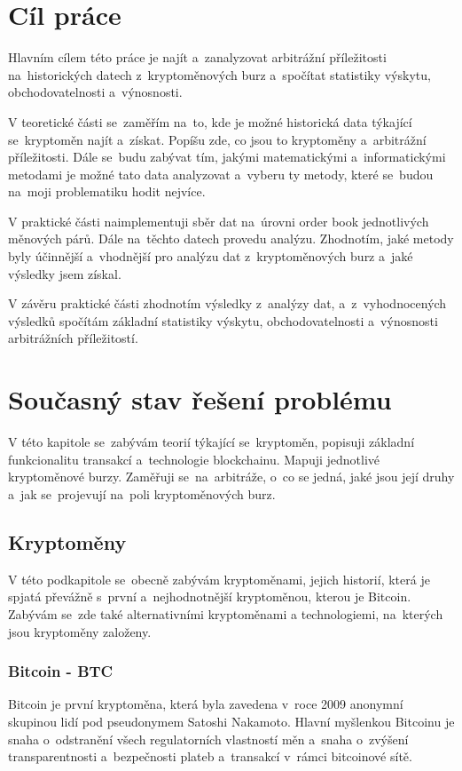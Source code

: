\documentclass[thesis=B,czech]{FITthesis}[2019/03/21]
\begin{document}
\chapter{Cíl práce}
Hlavním cílem této práce je najít a~zanalyzovat arbitrážní příležitosti na~historických datech z~kryptoměnových burz a~spočítat statistiky výskytu, obchodovatelnosti a~výnosnosti. 

V teoretické části se~zaměřím na~to, kde je možné historická data týkající se~kryptoměn najít a~získat. Popíšu zde, co jsou to kryptoměny a~arbitrážní příležitosti. Dále se~budu zabývat tím, jakými matematickými a~informatickými metodami je možné tato data analyzovat a~vyberu ty metody, které se~budou na~moji problematiku hodit nejvíce.

V praktické části naimplementuji sběr dat na~úrovni order book jednotlivých měnových párů. Dále na~těchto datech provedu analýzu. Zhodnotím, jaké metody byly účinnější a~vhodnější pro analýzu dat z~kryptoměnových burz a~jaké výsledky jsem získal.

V závěru praktické části zhodnotím výsledky z~analýzy dat, a~z~vyhodnocených výsledků spočítám základní statistiky výskytu, obchodovatelnosti a~výnosnosti arbitrážních příležitostí. 

\chapter{Současný stav řešení problému}
V této kapitole se~zabývám teorií týkající se~kryptoměn, popisuji základní funkcionalitu transakcí a~technologie blockchainu. Mapuji jednotlivé kryptoměnové burzy. Zaměřuji se~na~arbitráže, o~co se jedná, jaké jsou její druhy a~jak se~projevují na~poli kryptoměnových burz.

\section{Kryptoměny}
V této podkapitole se~obecně zabývám kryptoměnami, jejich historií, která je spjatá převážně s~první a~nejhodnotnější kryptoměnou, kterou je Bitcoin. Zabývám se~zde také alternativními kryptoměnami a technologiemi, na~kterých jsou kryptoměny založeny. \cite{BudoucnostFinTrhu}

\subsection{Bitcoin - BTC}
Bitcoin je první kryptoměna, která byla zavedena v~roce 2009 anonymní skupinou lidí pod pseudonymem Satoshi Nakamoto. Hlavní myšlenkou Bitcoinu je snaha o~odstranění všech regulatorních vlastností měn a~snaha o~zvýšení transparentnosti a~bezpečnosti plateb a~transakcí v~rámci bitcoinové sítě. \cite{Finex}
\end{document}
